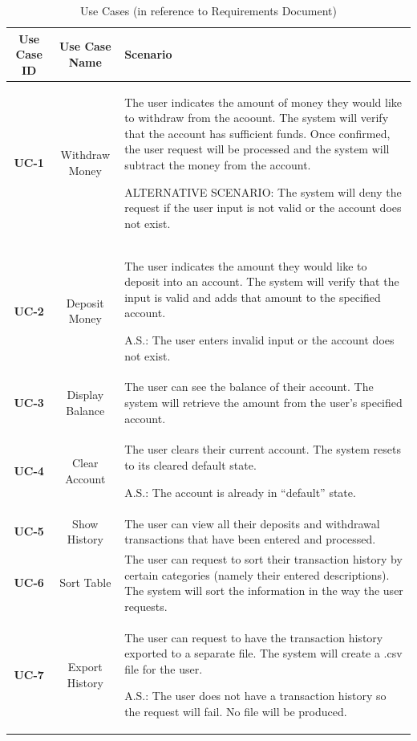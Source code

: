 \documentclass[12pt]{article}
\begin{document}
\begin{table}[H]\label{uc}
  \caption{Use Cases (in reference to Requirements Document)}
  \begin{center}
    \begin{tabular}[\textwidth]{|c|c|p{8cm}|}
      \hline
          {\bf Use Case ID} & {\bf Use Case Name} & {\bf Scenario}\\
          \hline
              {\bf UC-1} & Withdraw Money & The user indicates the amount of money they would like to withdraw from the acoount. The system will verify that the account has sufficient funds. Once confirmed, the user request will be processed and the system will subtract the money from the account.

              ALTERNATIVE SCENARIO: The system will deny the request if the user input is not valid or the account does not exist.\\\hline
              
              {\bf UC-2} & Deposit Money & The user indicates the amount they would like to deposit into an account. The system will verify that the input is valid and adds that amount to the specified account.

              A.S.: The user enters invalid input or the account does not exist.\\\hline
              {\bf UC-3} & Display Balance & The user can see the balance of their account. The system will retrieve the amount from the user's specified account.\\\hline
              {\bf UC-4} & Clear Account & The user clears their current account. The system resets to its cleared default state.

              A.S.: The account is already in ``default'' state.\\\hline

              {\bf UC-5} & Show History & The user can view all their deposits and withdrawal transactions that have been entered and processed.\\\hline

              {\bf UC-6} & Sort Table & The user can request to sort their transaction history by certain categories (namely their entered descriptions). The system will sort the information in the way the user requests.\\\hline

                {\bf UC-7} & Export History & The user can request to have the transaction history exported to a separate file. The system will create a .csv file for the user.

                A.S.: The user does not have a transaction history so the request will fail. No file will be produced.\\\hline

    \end{tabular}
  \end{center}
\end{table}
\end{document}
